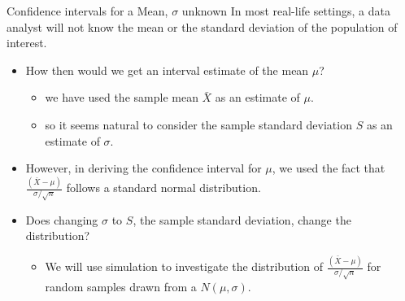 \documentclass[
  ignorenonframetext,
]{beamer}
\providecommand{\tightlist}{%
  \setlength{\itemsep}{0pt}\setlength{\parskip}{0pt}}
\begin{document}
\begin{frame}{Confidence intervals for a Mean, \(\sigma\) unknown}
\protect\hypertarget{confidence-intervals-for-a-mean-sigma-unknown}{}
In most real-life settings, a data analyst will not know the mean or the
standard deviation of the population of interest.

\begin{itemize}
\item
  How then would we get an interval estimate of the mean \(\mu\)?

  \begin{itemize}
  \tightlist
  \item
    we have used the sample mean \(\bar{X}\) as an estimate of \(\mu\).
  \item
    so it seems natural to consider the sample standard deviation \(S\)
    as an estimate of \(\sigma\).
  \end{itemize}
\item
  However, in deriving the confidence interval for \(\mu\), we used the
  fact that \(\frac{(\bar{X}-\mu)}{\sigma/\sqrt{n}}\) follows a standard
  normal distribution.
\item
  Does changing \(\sigma\) to \(S\), the sample standard deviation,
  change the distribution?

  \begin{itemize}
  \tightlist
  \item
    We will use simulation to investigate the distribution of
    \(\frac{(\bar{X}-\mu)}{\sigma/\sqrt{n}}\) for random samples drawn
    from a \(N(\mu, \sigma)\).
  \end{itemize}
\end{itemize}
\end{frame}
\end{document}
